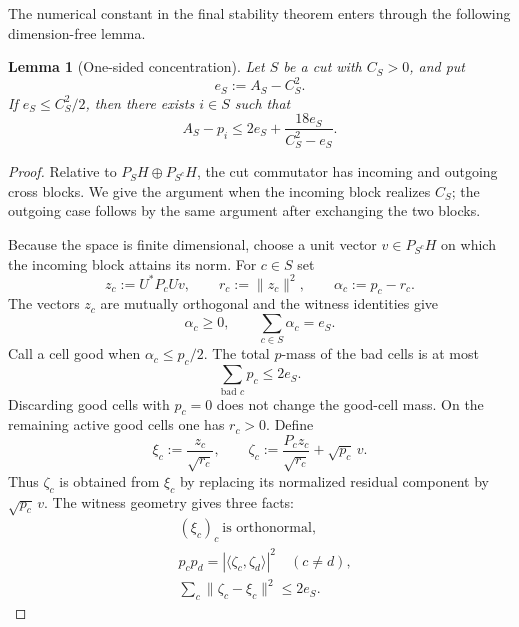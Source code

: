 \documentclass[11pt]{article}
\newtheorem{lemma}[theorem]{Lemma}
\begin{document}
The numerical constant in the final stability theorem enters through the
following dimension-free lemma.

\begin{lemma}[One-sided concentration]\label{lem:onesided}
Let $S$ be a cut with $C_S>0$, and put
\[
  e_S:=A_S-C_S^2.
\]
If $e_S\le C_S^2/2$, then there exists $i\in S$ such that
\begin{equation}\label{eq:onesided}
  A_S-p_i
  \le
  2e_S+\frac{18e_S}{C_S^2-e_S}.
\end{equation}
\end{lemma}

\begin{proof}
Relative to $P_SH\oplus P_{S^c}H$, the cut commutator has incoming and
outgoing cross blocks.  We give the argument when the incoming block realizes
$C_S$; the outgoing case follows by the same argument after exchanging the
two blocks.

Because the space is finite dimensional, choose a unit vector
$v\in P_{S^c}H$ on which the incoming block attains its norm.  For $c\in S$
set
\[
  z_c:=U^*P_cUv,\qquad
  r_c:=\|z_c\|^2,\qquad
  \alpha_c:=p_c-r_c.
\]
The vectors $z_c$ are mutually orthogonal and the witness identities give
\begin{equation}\label{eq:witness-defect}
  \alpha_c\ge0,\qquad
  \sum_{c\in S}\alpha_c=e_S.
\end{equation}
Call a cell good when $\alpha_c\le p_c/2$.  The total $p$-mass of the bad
cells is at most
\begin{equation}\label{eq:badmass}
  \sum_{\text{bad }c}p_c\le2e_S.
\end{equation}
Discarding good cells with $p_c=0$ does not change the good-cell mass.  On
the remaining active good cells one has $r_c>0$.  Define
\[
  \xi_c:=\frac{z_c}{\sqrt{r_c}},
  \qquad
  \zeta_c:=
    \frac{P_c z_c}{\sqrt{r_c}}+\sqrt{p_c}\,v.
\]
Thus $\zeta_c$ is obtained from $\xi_c$ by replacing its normalized residual
component by $\sqrt{p_c}\,v$.  The witness geometry gives three facts:
\begin{align}
  &(\xi_c)_c\ \text{is orthonormal}, \label{eq:xi-orth}\\
  &p_cp_d=|\langle\zeta_c,\zeta_d\rangle|^2
      \quad(c\ne d), \label{eq:zeta-gram}\\
  &\sum_c\|\zeta_c-\xi_c\|^2\le2e_S. \label{eq:gram-close}
\end{align}


\end{proof}
\end{document}
